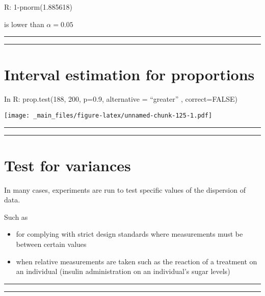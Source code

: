 \documentclass[
]{book}
\providecommand{\tightlist}{%
  \setlength{\itemsep}{0pt}\setlength{\parskip}{0pt}}
\begin{document}
R: 1-pnorm(1.885618)

is lower than \(\alpha=0.05\)

\begin{center}\rule{0.5\linewidth}{0.5pt}\end{center}

\begin{center}\rule{0.5\linewidth}{0.5pt}\end{center}

\hypertarget{interval-estimation-for-proportions-8}{%
\section{Interval estimation for proportions}\label{interval-estimation-for-proportions-8}}

In R: prop.test(188, 200, p=0.9, alternative = ``greater'' , correct=FALSE)

\texttt{[image: \_main\_files/figure-latex/unnamed-chunk-125-1.pdf]}

\begin{center}\rule{0.5\linewidth}{0.5pt}\end{center}

\begin{center}\rule{0.5\linewidth}{0.5pt}\end{center}

\hypertarget{test-for-variances}{%
\section{Test for variances}\label{test-for-variances}}

In many cases, experiments are run to test specific values of the dispersion of data.

Such as

\begin{itemize}
\tightlist
\item
  for complying with strict design standards where measurements must be between certain values
\item
  when relative measurements are taken such as the reaction of a treatment on an individual (insulin administration on an individual's sugar levels)
\end{itemize}

\begin{center}\rule{0.5\linewidth}{0.5pt}\end{center}

\begin{center}\rule{0.5\linewidth}{0.5pt}\end{center}
\end{document}
